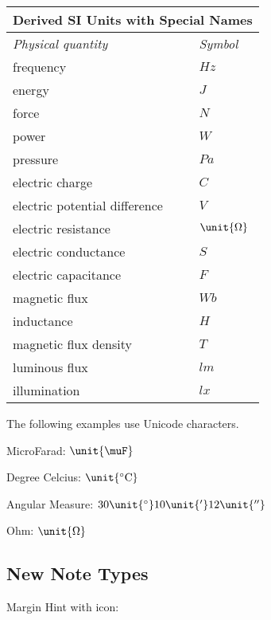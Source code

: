 \documentclass{article}
\begin{document}
\begin{tabular}{lll}
\multicolumn{3}{c}{\textbf{Derived SI Units with Special Names}} \\ \hline
\textit{Physical quantity} &  & \textit{Symbol} \\ \hline
frequency &  & $\unit{Hz}$ \\ 
energy &  & $\unit{J}$ \\ 
force &  & $\unit{N}$ \\ 
power &  & $\unit{W}$ \\ 
pressure &  & $\unit{Pa}$ \\ 
electric charge &  & $\unit{C}$ \\ 
electric potential difference &  & $\unit{V}$ \\ 
electric resistance &  & $\unit{%
\Omega%
}$ \\ 
electric conductance &  & $\unit{S}$ \\ 
electric capacitance &  & $\unit{F}$ \\ 
magnetic flux &  & $\unit{Wb}$ \\ 
inductance &  & $\unit{H}$ \\ 
magnetic flux density &  & $\unit{T}$ \\ 
luminous flux &  & $\unit{lm}$ \\ 
illumination &  & $\unit{lx}$ \\ \hline
\end{tabular}

The following examples use Unicode characters.

MicroFarad: $\unit{%
\mu%
F}$

Degree Celcius: $\unit{%
{}^{\circ}{\rm C}%
}$

Angular Measure: $30\unit{%
{{}^\circ}%
}10\unit{%
{}^{\prime }%
}12\unit{%
{}^{\prime \prime}%
}$

Ohm: $\unit{%
\Omega%
}$

\subsection{New Note Types}

Margin Hint with icon: 
\end{document}

